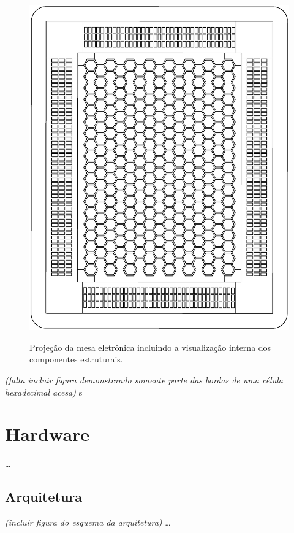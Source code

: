 \documentclass[a4paper,10pt]{article}
\begin{document}
\begin{center}
\begin{figure}[h!]
	\center
	\includegraphics[angle=0, scale=0.40]{./img/projeto-v02.ps}
	\label{figura_projeto}
	\caption{Projeção da mesa eletrônica incluindo a visualização interna dos componentes estruturais.}
\end{figure}
\end{center}

{\it (falta incluir figura demonstrando somente parte das bordas de uma célula hexadecimal acesa)}
s
\section{Hardware}

\ldots

\subsection{Arquitetura}

{\it (incluir figura do esquema da arquitetura)}
\ldots
\end{document}
